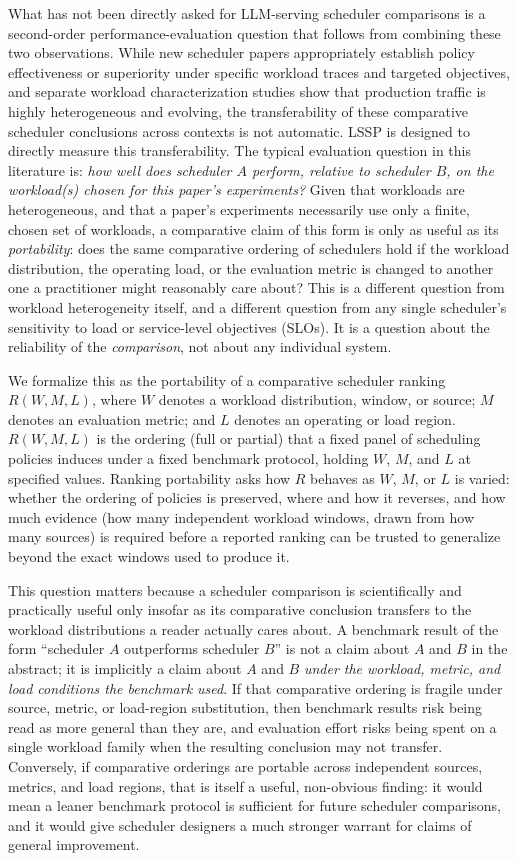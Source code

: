 What has not been directly asked for LLM-serving scheduler comparisons is
a second-order performance-evaluation question that follows from combining
these two observations. While new
scheduler papers appropriately establish policy effectiveness or superiority
under specific workload traces and targeted objectives, and separate workload
characterization studies show that production traffic is highly heterogeneous
and evolving, the transferability of these comparative scheduler conclusions
across contexts is not automatic. LSSP is designed to directly measure this
transferability.
The typical evaluation question in
this literature is: \emph{how well does scheduler $A$ perform, relative to
scheduler $B$, on the workload(s) chosen for this paper's experiments?} Given
that workloads are heterogeneous, and that a paper's experiments necessarily
use only a finite, chosen set of workloads, a comparative claim of this form
is only as useful as its \emph{portability}: does the same comparative
ordering of schedulers hold if the workload distribution, the operating
load, or the evaluation metric is changed to another one a practitioner
might reasonably care about? This is a different question from workload
heterogeneity itself, and a different question from any single scheduler's
sensitivity to load or service-level objectives (SLOs). It is a question about the reliability of the
\emph{comparison}, not about any individual system.

We formalize this as the portability of a comparative scheduler ranking
$R(W, M, L)$, where $W$ denotes a workload distribution, window, or source;
$M$ denotes an evaluation metric; and $L$ denotes an operating or load
region. $R(W, M, L)$ is the ordering (full or partial) that a fixed panel of
scheduling policies induces under a fixed benchmark protocol, holding $W$,
$M$, and $L$ at specified values. Ranking portability asks how $R$ behaves as
$W$, $M$, or $L$ is varied: whether the ordering of policies is preserved,
where and how it reverses, and how much evidence (how many independent
workload windows, drawn from how many sources) is required before a
reported ranking can be trusted to generalize beyond the exact windows used
to produce it.

This question matters because a scheduler comparison is scientifically and
practically useful only insofar as its comparative conclusion transfers to
the workload distributions a reader actually cares about. A benchmark result
of the form ``scheduler $A$ outperforms scheduler $B$'' is not a claim about
$A$ and $B$ in the abstract; it is implicitly a claim about $A$ and $B$
\emph{under the workload, metric, and load conditions the benchmark used}.
If that comparative ordering is fragile under source, metric, or
load-region substitution, then benchmark results risk being read as more
general than they are, and evaluation effort risks being spent on a single
workload family when the resulting conclusion may not transfer. Conversely,
if comparative orderings are portable across independent sources, metrics,
and load regions, that is itself a useful, non-obvious finding: it would
mean a leaner benchmark protocol is sufficient for future scheduler
comparisons, and it would give scheduler designers a much stronger warrant
for claims of general improvement.

